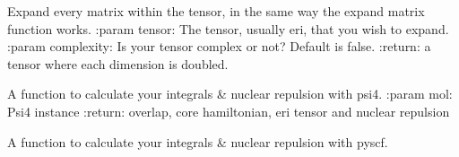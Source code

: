 \documentclass[letterpaper,10pt,english]{sphinxmanual}
\begin{document}

\begin{fulllineitems}
\label{\detokenize{SCF_functions:ghf.SCF_functions.expand_tensor}}
Expand every matrix within the tensor, in the same way the expand matrix function works.
:param tensor: The tensor, usually eri, that you wish to expand.
:param complexity: Is your tensor complex or not? Default is false.
:return: a tensor where each dimension is doubled.

\end{fulllineitems}


\begin{fulllineitems}
\label{\detokenize{SCF_functions:ghf.SCF_functions.get_integrals_psi4}}
A function to calculate your integrals \& nuclear repulsion with psi4.
:param mol: Psi4 instance
:return: overlap, core hamiltonian, eri tensor and nuclear repulsion

\end{fulllineitems}


\begin{fulllineitems}
\label{\detokenize{SCF_functions:ghf.SCF_functions.get_integrals_pyscf}}
A function to calculate your integrals \& nuclear repulsion with pyscf.

\end{fulllineitems}

\end{document}
